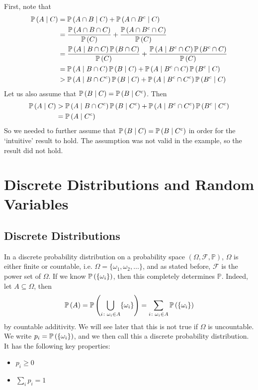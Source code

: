 \documentclass{article}
\begin{document}
First, note that
\begin{align*}
    \mathbb{P}\left({A \mid C}\right) & = \mathbb{P}\left({A \cap B \mid C}\right) + \mathbb{P}\left({A \cap {B}^c \mid C}\right)                                                                           \\
                    & = \frac{\mathbb{P}\left({A \cap B \cap C}\right)}{\mathbb{P}\left({C}\right)} + \frac{\mathbb{P}\left({A \cap {B}^c \cap C}\right)}{\mathbb{P}\left({C}\right)}                                         \\
                    & = \frac{\mathbb{P}\left({A \mid B \cap C}\right) \mathbb{P}\left({B \cap C}\right)}{\mathbb{P}\left({C}\right)} + \frac{\mathbb{P}\left({A \mid {B}^c \cap C}\right)\mathbb{P}\left({{B}^c \cap C}\right)}{\mathbb{P}\left({C}\right)} \\
                    & = \mathbb{P}\left({A \mid B \cap C}\right) \mathbb{P}\left({B \mid C}\right) + \mathbb{P}\left({A \mid {B}^c \cap C}\right) \mathbb{P}\left({{B}^c \mid C}\right)                                  \\
                    & > \mathbb{P}\left({A \mid B \cap {C}^c}\right) \mathbb{P}\left({B \mid C}\right) + \mathbb{P}\left({A \mid {B}^c \cap {C}^c}\right) \mathbb{P}\left({{B}^c \mid C}\right)
\end{align*}
Let us also assume that $\mathbb{P}\left({B \mid C}\right) = \mathbb{P}\left({B \mid {C}^c}\right)$. Then
\begin{align*}
    \mathbb{P}\left({A \mid C}\right) & > \mathbb{P}\left({A \mid B \cap {C}^c}\right) \mathbb{P}\left({B \mid {C}^c}\right) + \mathbb{P}\left({A \mid {B}^c \cap {C}^c}\right) \mathbb{P}\left({{B}^c \mid {C}^c}\right) \\
                    & = \mathbb{P}\left({A \mid {C}^c}\right)
\end{align*}
So we needed to further assume that $\mathbb{P}\left({B \mid C}\right) = \mathbb{P}\left({B \mid {C}^c}\right)$ in order for the `intuitive' result to hold. The assumption was not valid in the example, so the result did not hold.

\section{Discrete Distributions and Random Variables}
\subsection{Discrete Distributions}
In a discrete probability distribution on a probability space $(\Omega, \mathcal F, \mathbb P)$, $\Omega$ is either finite or countable, i.e. $\Omega = \{ \omega_1, \omega_2, \dots \}$, and as stated before, $\mathcal F$ is the power set of $\Omega$. If we know $\mathbb{P}\left({\{\omega_i\}}\right)$, then this completely determines $\mathbb P$. Indeed, let $A \subseteq \Omega$, then
\[ \mathbb{P}\left({A}\right) = \mathbb{P}\left({\bigcup_{i \colon \omega_i \in A} \{ \omega_i \}}\right) = \sum_{i \colon \omega_i \in A}\mathbb{P}\left({\{\omega_i\}}\right) \]
by countable additivity. We will see later that this is not true if $\Omega$ is uncountable. We write $p_i = \mathbb{P}\left({\{\omega_i\}}\right)$, and we then call this a discrete probability distribution. It has the following key properties:
\begin{itemize}
    \item $p_i \geq 0$
    \item $\sum_i p_i = 1$
\end{itemize}
\end{document}
